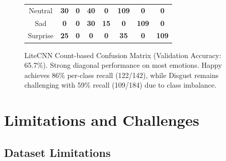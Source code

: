 \documentclass[12pt,a4paper]{article}
\begin{document}
\begin{figure}[h!]
\begin{tabular}{|c||ccccccc|}
Neutral & \cellcolor[HTML]{CCDDFF}\textcolor[HTML]{000000}{\textbf{30}} & \cellcolor[HTML]{F0F8FF}\textcolor[HTML]{000000}{\textbf{0}} & \cellcolor[HTML]{CCDDFF}\textcolor[HTML]{000000}{\textbf{40}} & \cellcolor[HTML]{F0F8FF}\textcolor[HTML]{000000}{\textbf{0}} & \cellcolor[HTML]{08519C}\textcolor[HTML]{ffffff}{\textbf{109}} & \cellcolor[HTML]{F0F8FF}\textcolor[HTML]{000000}{\textbf{0}} & \cellcolor[HTML]{F0F8FF}\textcolor[HTML]{000000}{\textbf{0}} \\
Sad & \cellcolor[HTML]{F0F8FF}\textcolor[HTML]{000000}{\textbf{0}} & \cellcolor[HTML]{F0F8FF}\textcolor[HTML]{000000}{\textbf{0}} & \cellcolor[HTML]{CCDDFF}\textcolor[HTML]{000000}{\textbf{30}} & \cellcolor[HTML]{F0F8FF}\textcolor[HTML]{000000}{\textbf{15}} & \cellcolor[HTML]{F0F8FF}\textcolor[HTML]{000000}{\textbf{0}} & \cellcolor[HTML]{08519C}\textcolor[HTML]{ffffff}{\textbf{109}} & \cellcolor[HTML]{F0F8FF}\textcolor[HTML]{000000}{\textbf{0}} \\
Surprise & \cellcolor[HTML]{CCDDFF}\textcolor[HTML]{000000}{\textbf{25}} & \cellcolor[HTML]{F0F8FF}\textcolor[HTML]{000000}{\textbf{0}} & \cellcolor[HTML]{F0F8FF}\textcolor[HTML]{000000}{\textbf{0}} & \cellcolor[HTML]{F0F8FF}\textcolor[HTML]{000000}{\textbf{0}} & \cellcolor[HTML]{CCDDFF}\textcolor[HTML]{000000}{\textbf{35}} & \cellcolor[HTML]{F0F8FF}\textcolor[HTML]{000000}{\textbf{0}} & \cellcolor[HTML]{08519C}\textcolor[HTML]{ffffff}{\textbf{109}} \\
\hline
\end{tabular}
    \caption{LiteCNN Count-based Confusion Matrix (Validation Accuracy: 65.7\%). Strong diagonal performance on most emotions. Happy achieves 86\% per-class recall (122/142), while Disgust remains challenging with 59\% recall (109/184) due to class imbalance.}
    \label{fig:litecnn_f1_matrix}
\end{figure}

\section{Limitations and Challenges}

\subsection{Dataset Limitations}
\end{document}
